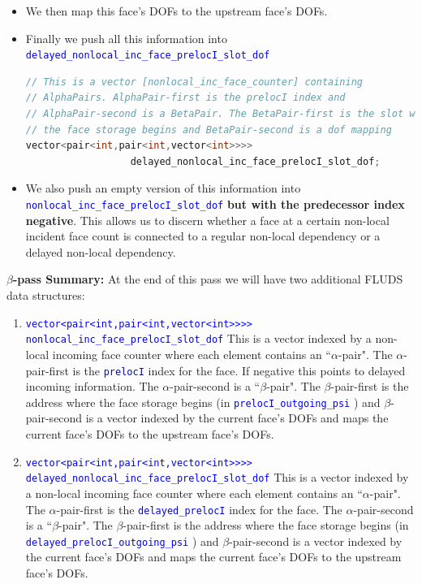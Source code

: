 \documentclass[11pt,letterpaper,titlepage]{article}
\newcommand{\xmltag}[1]{\textcolor{blue}{ \texttt{#1}} }
\numberwithin{equation}{section}
\begin{document}
\begin{itemize}
\begin{itemize}
\begin{itemize}
\item We then map this face's DOFs to the upstream face's DOFs.
\item Finally we push all this information into \xmltag{delayed\_nonlocal\_inc\_face\_prelocI\_slot\_dof}
\begin{lstlisting}[language=c++]
// This is a vector [nonlocal_inc_face_counter] containing
// AlphaPairs. AlphaPair-first is the prelocI index and
// AlphaPair-second is a BetaPair. The BetaPair-first is the slot where
// the face storage begins and BetaPair-second is a dof mapping
vector<pair<int,pair<int,vector<int>>>>
                  delayed_nonlocal_inc_face_prelocI_slot_dof;
\end{lstlisting}
\item We also push an empty version of this information into \xmltag{nonlocal\_inc\_face\_prelocI\_slot\_dof} \textbf{but with the predecessor index negative}. This allows us to discern whether a face at a certain non-local incident face count is connected to a regular non-local dependency or a delayed non-local dependency.
\end{itemize}

\end{itemize}
\end{itemize}

\vspace{0.25in}
\textbf{$\beta$-pass Summary:}\newline
At the end of this pass we will have two additional FLUDS data structures:

\begin{enumerate}
\item \xmltag{vector<pair<int,pair<int,vector<int>>>>
    nonlocal\_inc\_face\_prelocI\_slot\_dof} \newline
This is a vector indexed by a non-local incoming face counter where each element contains an ``$\alpha$-pair". The $\alpha$-pair-first is the \xmltag{prelocI} index for the face. If negative this points to delayed incoming information. The $\alpha$-pair-second is a ``$\beta$-pair". The $\beta$-pair-first is the address where the face storage begins (in \xmltag{prelocI\_outgoing\_psi}) and $\beta$-pair-second is a vector indexed by the current face's DOFs and maps the current face's DOFs to the upstream face's DOFs.

\item \xmltag{vector<pair<int,pair<int,vector<int>>>>
    delayed\_nonlocal\_inc\_face\_prelocI\_slot\_dof} \newline
This is a vector indexed by a non-local incoming face counter where each element contains an ``$\alpha$-pair". The $\alpha$-pair-first is the \xmltag{delayed\_prelocI} index for the face. The $\alpha$-pair-second is a ``$\beta$-pair". The $\beta$-pair-first is the address where the face storage begins (in \xmltag{delayed\_prelocI\_outgoing\_psi}) and $\beta$-pair-second is a vector indexed by the current face's DOFs and maps the current face's DOFs to the upstream face's DOFs.
\end{enumerate}
\end{document}
